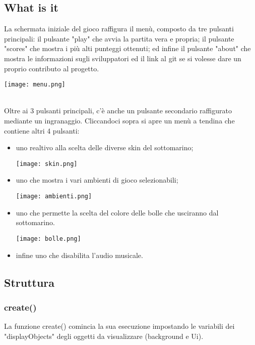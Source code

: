 \documentclass[12pt]{article}
\begin{document}
\subsection{What is it}
La schermata iniziale del gioco raffigura il menù, composto da tre pulsanti principali: il pulsante "play" che avvia la partita vera e propria; il pulsante "scores" che mostra i più alti punteggi ottenuti; ed infine il pulsante "about" che mostra le informazioni sugli sviluppatori ed il link al git se si volesse dare un proprio contributo al progetto. \\
\begin{center}
    \texttt{[image: menu.png]}\\
\end{center}
\\
Oltre ai 3 pulsanti principali, c'è anche un pulsante secondario raffigurato mediante un ingranaggio. Cliccandoci sopra si apre un menù a tendina che contiene altri 4 pulsanti:
\begin{itemize}
    \item uno realtivo alla scelta delle diverse skin del sottomarino; 
\begin{center}
    \texttt{[image: skin.png]}\\
\end{center}
    \item uno che mostra i vari ambienti di gioco selezionabili; 

\begin{center}
    \texttt{[image: ambienti.png]}\\
\end{center}


    \item uno che permette la scelta del colore delle bolle che usciranno dal sottomarino. 
\\
\begin{center}
    \texttt{[image: bolle.png]}\\
\end{center}

    \item infine uno che disabilita l'audio musicale. 
\end{itemize}

\subsection{Struttura}
\subsubsection{create()}
La funzione create() comincia la sua esecuzione impostando le variabili dei "displayObjects" degli oggetti da visualizzare (background e Ui). 
\\
\end{document}

